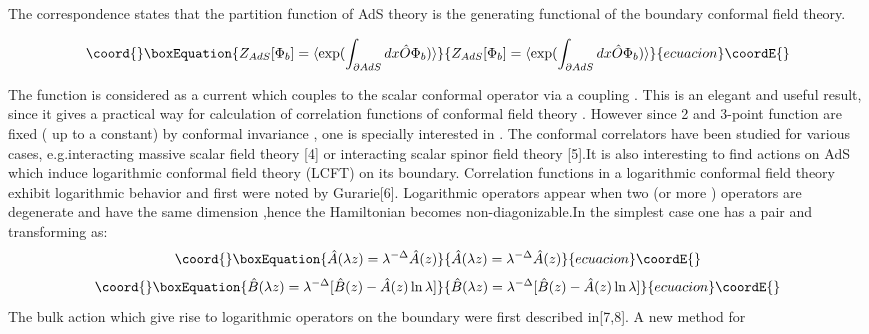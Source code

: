 \documentclass[a4paper,12pt]{article}
\begin{document}
         The correspondence states that the partition function
         of AdS theory is the generating functional of the
         boundary conformal field theory.

               \begin{equation}\coord{}\boxEquation{\label{eq:a2}
               Z_{AdS}[\Phi_{b}]=\langle \exp(\int_{\partial AdS} dx \hat{O}\Phi_b)\rangle
                }{Z_{AdS}[\Phi_{b}]=\langle \exp(\int_{\partial AdS} dx \hat{O}\Phi_b)\rangle
                }{ecuacion}\coordE{}\end{equation}


         The function \coordHE{} is considered as a current which couples to  the
         scalar conformal operator \coordHE{} via  a coupling \coordHE{}.
         This is an elegant and useful result, since it gives a
         practical way for calculation of correlation functions of
         conformal field theory .
        However since 2 and 3-point function are fixed ( up to
         a constant) by conformal invariance , one is specially
         interested in  \coordHE{}.
         The conformal correlators have been studied for various
         cases, e.g.interacting massive scalar field theory [4] or interacting scalar spinor field
         theory [5].It is also interesting to find actions on AdS which induce logarithmic conformal field
theory (LCFT) on its boundary.
 Correlation functions in a
logarithmic conformal field theory exhibit logarithmic behavior
and first were noted by Gurarie[6]. Logarithmic operators appear
when two (or more ) operators are degenerate and have the same
dimension ,hence the Hamiltonian becomes non-diagonizable.In the
simplest case one has a pair \coordHE{} and \coordHE{} transforming
as:
 \begin{equation}\coord{}\boxEquation{
 \hat{A}(\lambda z)=\lambda^{-\Delta}\hat{A}(z)\nonumber
 }{
 \hat{A}(\lambda z)=\lambda^{-\Delta}\hat{A}(z)\nonumber
 }{ecuacion}\coordE{}\end{equation}
 \begin{equation}\coord{}\boxEquation{   \label{eq:a3}
\hat{B}(\lambda
z)=\lambda^{-\Delta}[\hat{B}(z)-\hat{A}(z)\ln\lambda]
}{   \hat{B}(\lambda
z)=\lambda^{-\Delta}[\hat{B}(z)-\hat{A}(z)\ln\lambda]
}{ecuacion}\coordE{}\end{equation}
The bulk action which give rise to logarithmic operators on the
boundary were first described in[7,8]. A new method for
\end{document}
